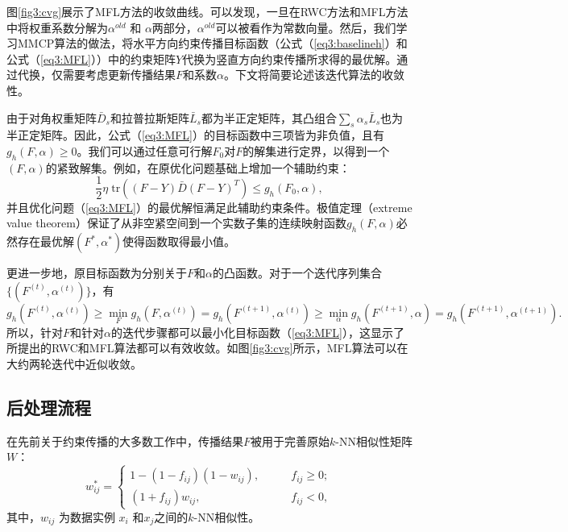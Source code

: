 图\ref{fig3:cvg}展示了MFL方法的收敛曲线。可以发现，一旦在RWC方法和MFL方法中将权重系数分解为$ {\alpha}^{old} $ 和 $ {\alpha} $两部分，$ {\alpha}^{old} $可以被看作为常数向量。然后，我们学习MMCP算法的做法，将水平方向约束传播目标函数（公式（\ref{eq3:baselineh}）和公式（\ref{eq3:MFL}））中的约束矩阵$Y$代换为竖直方向约束传播所求得的最优解。通过代换，仅需要考虑更新传播结果$F$和系数$\alpha$。下文将简要论述该迭代算法的收敛性。

由于对角权重矩阵$ \bar{{D}}_s $和拉普拉斯矩阵$\bar{L}_s$都为半正定矩阵，其凸组合$ \sum_s\alpha_s\bar{{L}}_s $也为半正定矩阵。因此，公式（\ref{eq3:MFL}）的目标函数中三项皆为非负值，且有$ g_h({F}, {\alpha}) \ge 0 $。我们可以通过任意可行解$F_0$对$F$的解集进行定界，以得到一个$(F, \alpha)$的紧致解集。例如，在原优化问题基础上增加一个辅助约束：
\begin{equation}
        \frac{1}{2}\eta\;\mathrm{tr}(({F}-{Y})\bar{{D}}({F}-{Y})^T)  \le g_h({F}_0, {\alpha}),
\end{equation}
并且优化问题（\ref{eq3:MFL}）的最优解恒满足此辅助约束条件。极值定理（extreme value theorem）保证了从非空紧空间到一个实数子集的连续映射函数$ g_h({F}, {\alpha})$必然存在最优解$({F}^*, {\alpha}^*) $使得函数取得最小值。

更进一步地，原目标函数为分别关于$F$和$\alpha$的凸函数。对于一个迭代序列集合$ \{({F}^{(t)}, {\alpha}^{(t)})\} $，有
\begin{equation}
    g_h({F}^{(t)}, {\alpha}^{(t)}) \ge \mathop{\mathrm{min}}_{{F}} g_h({F}, {\alpha}^{(t)}) = g_h({F}^{(t+1)}, {\alpha}^{(t)}) \ge \mathop{\mathrm{min}}_ {{\alpha}} g_h({F}^{(t+1)}, {\alpha}) =g_h({F}^{(t+1)}, {\alpha}^{(t+1)}).
\end{equation}
所以，针对$F$和针对$\alpha$的迭代步骤都可以最小化目标函数（\ref{eq3:MFL}），这显示了所提出的RWC和MFL算法都可以有效收敛。如图\ref{fig3:cvg}所示，MFL算法可以在大约两轮迭代中近似收敛。

\subsection{后处理流程}
在先前关于约束传播的大多数工作中，传播结果$F$被用于完善原始$k$-NN相似性矩阵$W$：
\begin{equation}
w^*_{ij} = 
\begin{cases}
1-(1-f_{ij})(1-w_{ij}), \qquad &f_{ij}\ge 0;\\
(1+f_{ij})w_{ij}, &f_{ij}< 0,
\end{cases}
\label{eq3:refine}
\end{equation}
其中，$ w_{ij} $ 为数据实例 $ x_i $ 和$ x_j $之间的$k$-NN相似性。

